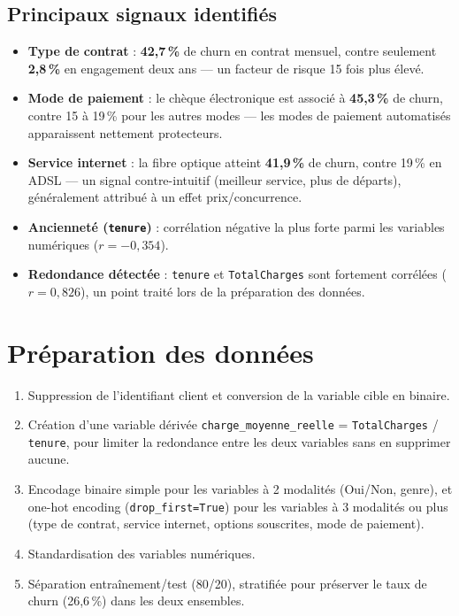\documentclass[11pt,a4paper]{article}
\begin{document}
\subsection{Principaux signaux identifiés}
\begin{itemize}
\item \textbf{Type de contrat} : \textbf{42,7\,\%} de churn en contrat mensuel, contre seulement \textbf{2,8\,\%} en engagement deux ans — un facteur de risque 15 fois plus élevé.
\item \textbf{Mode de paiement} : le chèque électronique est associé à \textbf{45,3\,\%} de churn, contre 15 à 19\,\% pour les autres modes — les modes de paiement automatisés apparaissent nettement protecteurs.
\item \textbf{Service internet} : la fibre optique atteint \textbf{41,9\,\%} de churn, contre 19\,\% en ADSL — un signal contre-intuitif (meilleur service, plus de départs), généralement attribué à un effet prix/concurrence.
\item \textbf{Ancienneté (\texttt{tenure})} : corrélation négative la plus forte parmi les variables numériques ($r=-0{,}354$).
\item \textbf{Redondance détectée} : \texttt{tenure} et \texttt{TotalCharges} sont fortement corrélées ($r=0{,}826$), un point traité lors de la préparation des données.
\end{itemize}

\section{Préparation des données}

\begin{enumerate}[label=\arabic*.]
\item Suppression de l'identifiant client et conversion de la variable cible en binaire.
\item Création d'une variable dérivée \texttt{charge\_moyenne\_reelle} = \texttt{TotalCharges} / \texttt{tenure}, pour limiter la redondance entre les deux variables sans en supprimer aucune.
\item Encodage binaire simple pour les variables à 2 modalités (Oui/Non, genre), et one-hot encoding (\texttt{drop\_first=True}) pour les variables à 3 modalités ou plus (type de contrat, service internet, options souscrites, mode de paiement).
\item Standardisation des variables numériques.
\item Séparation entraînement/test (80/20), stratifiée pour préserver le taux de churn (26,6\,\%) dans les deux ensembles.
\end{enumerate}
\end{document}
